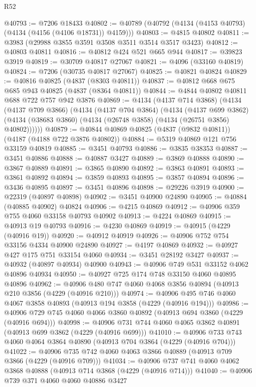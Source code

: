 \begin{lexlean}{R52}
\begin{coremodule}
@40793 := @7206 @18433
@40802 := @40789 (@40792 (@4134 (@4153 @40793) (@4134 (@4156 (@4106 @18731)) @4159)))
@40803 := @4815 @40802
@40811 := @3983 (@29988 @3855 @3591 @3508 @3511 @3514 @3517 @3423)
@40812 := @40803 @40811
@40816 := @40812 @424 @521 @665 @944
@40817 := @39823 @3919
@40819 := @30709 @40817 @27067
@40821 := @4096 (@33160 @40819)
@40824 := @7206 (@30735 @40817 @27067)
@40825 := @40821 @40824
@40829 := @40816 @40825 (@4837 (@8303 @40811))
@40837 := @40812 @668 @675 @685 @943 @40825 (@4837 (@8364 @40811))
@40844 := @4844 @40802 @40811 @688 @722 @757 @942 @3876
@40869 := @4134
    (@4137 @714 @3868)
    (@4134
      (@4137 @709 @3866)
      (@4134
        (@4137 @704 @3864)
        (@4134
          (@4137 @699 @3862)
          (@4134 (@38683 @3860) (@4134 (@26748 @3858) (@4134 (@26751 @3856) @40802))))))
@40879 := @40844 @40869 @40825 (@4837 (@9832 @40811)) (@4187 (@4188 @722 @3876 @40802))
@40884 := @5319 @40869 @121 @756 @33159 @40819
@40885 := @3451 @40793
@40886 := @3835 @38353
@40887 := @3451 @40886
@40888 := @40887 @3427
@40889 := @3869 @40888
@40890 := @3867 @40889
@40891 := @3865 @40890
@40892 := @3863 @40891
@40893 := @3861 @40892
@40894 := @3859 @40893
@40895 := @3857 @40894
@40896 := @3436 @40895
@40897 := @3451 @40896
@40898 := @29226 @3919
@40900 := @22319 (@40897 @40898)
@40902 := @3451 @40900 @24890
@40905 := @40884 (@40885 @40902) @40824
@40906 := @4215 @40869
@40912 := @40906 @359 @755 @4060 @33158 @40793 @40902
@40913 := @4224 @40869
@40915 := @40913 @19 @40793
@40916 := @4230 @40869
@40919 := @40915 (@4229 (@40916 @19))
@40920 := @40912 @40919
@40926 := @40906 @752 @754 @33156 @4334 @40900 @24890
@40927 := @4197 @40869
@40932 := @40927 @427 @175 @751 @33154 @4060
@40934 := @3451 @28192 @3427
@40937 := @40932 (@40897 @40934) @40900
@40943 := @40906 @749 @531 @33152 @4062 @40896 @40934
@40950 := @40927 @725 @174 @748 @33150 @4060 @40895 @40896
@40962 := @40906 @480 @747 @4060 @4068 @3856 @40894 (@40913 @210 @3856 (@4229 (@40916 @210)))
@40974 := @40906 @495 @746 @4060 @4067 @3858 @40893 (@40913 @194 @3858 (@4229 (@40916 @194)))
@40986 := @40906 @729 @745 @4060 @4066 @3860 @40892 (@40913 @694 @3860 (@4229 (@40916 @694)))
@40998 := @40906 @731 @744 @4060 @4065 @3862 @40891 (@40913 @699 @3862 (@4229 (@40916 @699)))
@41010 := @40906 @733 @743 @4060 @4064 @3864 @40890 (@40913 @704 @3864 (@4229 (@40916 @704)))
@41022 := @40906 @735 @742 @4060 @4063 @3866 @40889 (@40913 @709 @3866 (@4229 (@40916 @709)))
@41034 := @40906 @737 @741 @4060 @4062 @3868 @40888 (@40913 @714 @3868 (@4229 (@40916 @714)))
@41040 := @40906 @739 @371 @4060 @4060 @40886 @3427

\end{coremodule}
\end{lexlean}
